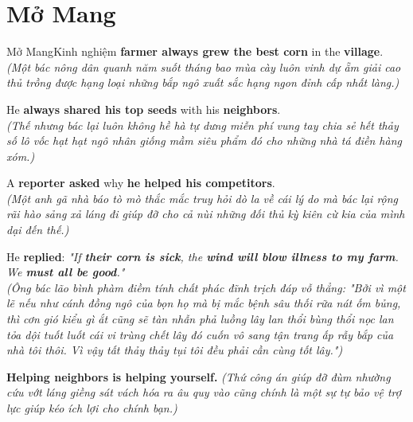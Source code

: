 \section{Mở Mang}
\begin{truyen}{Mở Mang}{Kinh nghiệm}
 \textbf{farmer always grew the best corn} in the \textbf{village}.\\
\textit{(Một bác nông dân quanh năm suốt tháng bao mùa cày luôn vinh dự ẵm giải cao thủ trồng được hạng loại những bắp ngô xuất sắc hạng ngon đỉnh cấp nhất làng.)}

He \textbf{always shared his top seeds} with his \textbf{neighbors}.\\
\textit{(Thế nhưng bác lại luôn không hề hà tự dưng miễn phí vung tay chia sẻ hết thảy số lô vốc hạt hạt ngô nhân giống mầm siêu phẩm đó cho những nhà tá điền hàng xóm.)}

A \textbf{reporter asked} why \textbf{he helped his competitors}.\\
\textit{(Một anh gã nhà báo tò mò thắc mắc truy hỏi dò la về cái lý do mà bác lại rộng rãi hào sảng xả láng đi giúp đỡ cho cả nùi những đối thủ kỳ kiên cừ kia của mình dại đến thế.)}

He \textbf{replied}: \textit{"If \textbf{their corn is sick}, the \textbf{wind will blow illness to my farm}. We \textbf{must all be good}."}\\
\textit{(Ông bác lão bình phàm điềm tính chất phác đĩnh trịch đáp vỗ thẳng: "Bởi vì một lẽ nếu như cánh đồng ngô của bọn họ mà bị mắc bệnh sâu thối rữa nát ốm bủng, thì cơn gió kiểu gì ắt cũng sẽ tàn nhẫn phả luồng lây lan thổi bùng thổi nọc lan tỏa dội tuốt luốt cái vi trùng chết lây đó cuốn vô sang tận trang ấp rẫy bắp của nhà tôi thôi. Vì vậy tất thảy thảy tụi tôi đều phải cần cùng tốt lây.")}
\end{truyen}

\begin{baihoc}
  \textbf{Helping neighbors is helping yourself.} \textit{(Thứ công án giúp đỡ đùm nhường cứu vớt láng giềng sát vách hóa ra âu quy vào cũng chính là một sự tự bảo vệ trợ lực giúp kéo ích lợi cho chính bạn.)}
\end{baihoc}

\vspace{0.8cm}

\ngayDay{}
